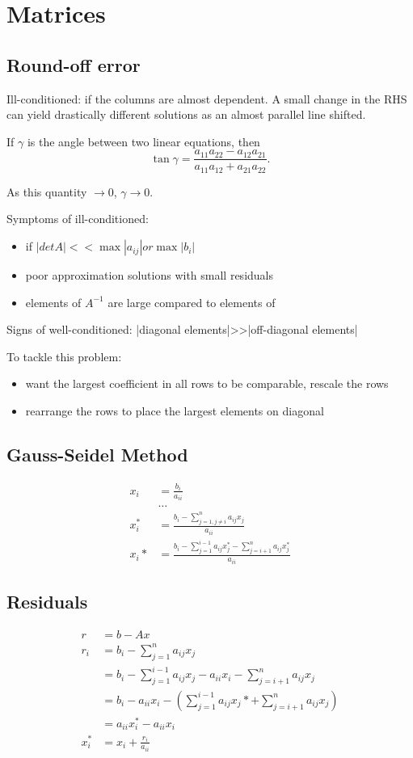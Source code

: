 \documentclass[class=article, crop=false]{standalone}
\theoremstyle{plain}
\theoremstyle{remark}
\begin{document}
\section{Matrices}
\subsection{Round-off error}
Ill-conditioned: if the columns are almost dependent. A small change in the RHS can yield drastically different solutions as an almost parallel line shifted.

If $\gamma$ is the angle between two linear equations, then
\[
\tan \gamma = \frac{a_{11}a_{22}-a_{12}a_{21}}{a_{11}a_{12}+a_{21}a_{22}}
.\] 

As this quantity $\to 0$, $\gamma \to 0$.

Symptoms of ill-conditioned: 
\begin{itemize}
	\item if $|det A|<< \max|a_{ij}| or \max|b_i|$
	\item poor approximation solutions with small residuals
	\item elements of $A^{-1}$ are large compared to elements of 
\end{itemize}
Signs of well-conditioned: |diagonal elements|>>|off-diagonal elements|

To tackle this problem:
\begin{itemize}
	\item want the largest coefficient in all rows to be comparable, rescale the rows
	\item rearrange the rows to place the largest elements on diagonal
\end{itemize}

\subsection{Gauss-Seidel Method}
\begin{align*}
	x_i &= \frac{b_i}{a_{ii}} \\
	&\ldots\\
	x_i^* &=  \frac{b_i -\sum_{j=1,j \neq i}^{ n} a_{ij} x_j }{a_{ii}}\\
	x_i* &= \frac{b_i-\sum_{ j=1}^{ i-1} a_{ij} x_j^* -\sum_{ j=i+1}^{ n} a_{ij} x_j^* }{a_{ii}}
\end{align*}
\subsection{Residuals}
\begin{align*}
	r&= b-Ax \\
	r_i&= b_i - \sum_{ j=1}^{ n} a_{ij} x_j\\
	   &= b_i - \sum_{ j=1}^{ i-1}  a_{ij} x_j - a_{ii}x_i - \sum_{ j=i+1}^{ n} a_{ij} x_j \\
	   &=  b_i - a_{ii}x_i - (\sum_{ j=1}^{ i-1} a_{ij} x_j*  + \sum_{ j=i+1}^{ n} a_{ij} x_j) \\
	   &= a_{ii} x_i^* - a_{ii} x_i \\
	x_i^* &= x_i + \frac{r_i}{a_{ii} }
\end{align*}
\end{document}
